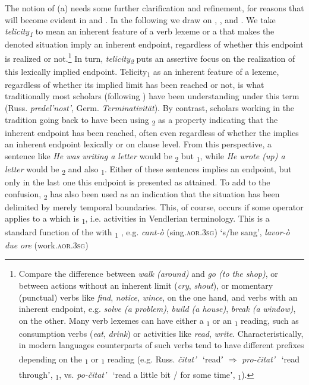 \documentclass[output=paper]{langsci/langscibook}
\begin{document}
The notion of (a) needs some further clarification and refinement, for reasons that will become evident in  and . In the following we draw on \citet{Dahl1981}, \citet{Łaziński1996}, and \citet[21--24]{Arkadiev2015}. We take \textit{telicity}\textit{\textsubscript{1}} to mean an inherent feature of a verb lexeme or a  that makes the denoted situation imply an inherent endpoint, regardless of whether this endpoint is realized or not.\footnote{Compare the difference between \textit{walk (around)} and \textit{go (to the shop)}, or between actions without an inherent limit (\textit{cry}, \textit{shout}), or momentary (punctual) verbs like \textit{find}, \textit{notice}, \textit{wince}, on the one hand, and verbs with an inherent endpoint, e.g. \textit{solve (a problem)}, \textit{build (a house)}, \textit{break (a window)}, on the other. Many verb lexemes can have either a \textsubscript{1} or an \textsubscript{1} reading, such as consumption verbs (\textit{eat}, \textit{drink}) or activities like \textit{read}, \textit{write}. Characteristically, in modern  languages  counterparts of such verbs tend to have different prefixes depending on the \textsubscript{1} or \textsubscript{1} reading (e.g. Russ. \textit{čitat’}{\textsuperscript{~}\IPFV} ‘readʼ ${\Rightarrow}$ \textit{pro-čitat’}{\textsuperscript{~}\PFV} ‘read throughʼ, \textsubscript{1}, vs. \textit{po-čitat’}{\textsuperscript{~}\PFV} ‘read a little bit / for some timeʼ, \textsubscript{1}).} In turn, \textit{telicity}\textit{\textsubscript{2}} puts an assertive focus on the realization of this lexically implied endpoint. Telicity\textsubscript{1} as an inherent feature of a lexeme, regardless of whether its implied limit has been reached or not, is what traditionally most  scholars (following \citealt{Maslov1948}) have been understanding under this term (Russ. \textit{predel’nost’}, Germ. \textit{Terminativität}). By contrast, scholars working in the tradition going back to \citet{Vendler1957} have been using \textsubscript{2} as a property indicating that the inherent endpoint has been reached, often even regardless of whether the  implies an inherent endpoint lexically or on clause level. From this perspective, a sentence like \textit{He was writing a letter} would be \textsubscript{2} but \textsubscript{1}, while \textit{He wrote (up) a letter} would be \textsubscript{2} and also \textsubscript{1}. Either of these sentences implies an endpoint, but only in the last one this endpoint is presented as attained. To add to the confusion, \textsubscript{2} has also been used as an indication that the situation has been delimited by merely temporal boundaries. This, of course, occurs if some  operator applies to a  which is \textsubscript{1}, i.e. activities in Vendlerian terminology. This is a standard function of the  with \textsubscript{1} , e.g.  \textit{cant-ò} (sing.\textsc{aor.3sg)} ‘s/he sang’, \textit{lavor-ò due ore} (work.\textsc{aor.3sg}) 
\end{document}
